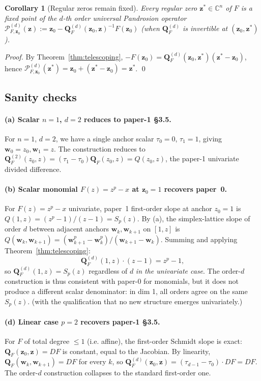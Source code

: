 \documentclass[11pt,a4paper]{article}
\newtheorem{corollary}[theorem]{Corollary}
\theoremstyle{definition}
\theoremstyle{remark}
\newcommand{\C}{\mathbb{C}}
\newcommand{\zb}{\mathbf{z}}
\newcommand{\wb}{\mathbf{w}}
\newcommand{\Qb}{\mathbf{Q}}
\begin{document}
\begin{corollary}[Regular zeros remain fixed]
Every regular zero $\zb^* \in \C^n$ of $F$ is a fixed point of the
$d$-th order universal Pandrosion operator
$\mathcal{P}_{F, \zb_0}^{(d)}(\zb) := \zb_0 - \Qb_F^{(d)}(\zb_0, \zb)^{-1} F(\zb_0)$
(when $\Qb_F^{(d)}$ is invertible at $(\zb_0, \zb^*)$).
\end{corollary}

\begin{proof}
By Theorem~\ref{thm:telescoping}, $-F(\zb_0) = \Qb_F^{(d)}(\zb_0, \zb^*)(\zb^* - \zb_0)$,
hence $\mathcal{P}_{F, \zb_0}^{(d)}(\zb^*) = \zb_0 + (\zb^* - \zb_0) = \zb^*$. \qed
\end{proof}

\subsection{Sanity checks}

\paragraph{(a) Scalar $n = 1$, $d = 2$ reduces to paper-1 §3.5.}
For $n = 1$, $d = 2$, we have a single anchor scalar $\tau_0 = 0$, $\tau_1 = 1$,
giving $\wb_0 = z_0, \wb_1 = z$. The construction reduces to
$\Qb_F^{(2)}(z_0, z) = (\tau_1 - \tau_0) \Qb_F(z_0, z) = Q(z_0, z)$,
the paper-1 univariate divided difference. \checkmark

\paragraph{(b) Scalar monomial $F(z) = z^p - x$ at $\zb_0 = 1$ recovers paper~0.}
For $F(z) = z^p - x$ univariate, paper~1 first-order slope at anchor $z_0 = 1$ is
$Q(1, z) = (z^p - 1)/(z - 1) = S_p(z)$. By (a), the simplex-lattice slope of
order $d$ between adjacent anchors $\wb_k, \wb_{k+1}$ on $[1, z]$ is
$Q(\wb_k, \wb_{k+1}) = (\wb_{k+1}^p - \wb_k^p)/(\wb_{k+1} - \wb_k)$.
Summing and applying Theorem~\ref{thm:telescoping}:
\[
\Qb_F^{(d)}(1, z) \cdot (z - 1) = z^p - 1,
\]
so $\Qb_F^{(d)}(1, z) = S_p(z)$ regardless of $d$ \emph{in the univariate case}.
The order-$d$ construction is thus consistent with paper-0 for monomials, but
it does not produce a different scalar denominator: in dim 1, all orders agree
on the same $S_p(z)$. \checkmark (with the qualification that no new structure
emerges univariately.)

\paragraph{(d) Linear case $p = 2$ recovers paper-1 §3.5.}
For $F$ of total degree $\le 1$ (i.e. affine), the first-order Schmidt slope is
exact: $\Qb_F(\zb_0, \zb) = DF$ is constant, equal to the Jacobian. By
linearity, $\Qb_F(\wb_k, \wb_{k+1}) = DF$ for every $k$, so
$\Qb_F^{(d)}(\zb_0, \zb) = (\tau_{d-1} - \tau_0) \cdot DF = DF$.
The order-$d$ construction collapses to the standard first-order one. \checkmark
\end{document}

